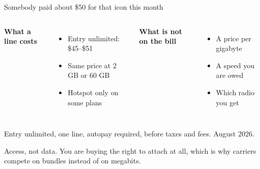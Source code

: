 \begin{frame}{Somebody paid about \$50 for that icon this month}
  \begin{columns}[T,onlytextwidth]
      \large\textbf{What a line costs}

      \vspace{0.5em}
      \small
      \begin{itemize}\itemsep4pt
        \item Entry unlimited: \$45--\$51
        \item Same price at 2 GB or 60 GB
        \item Hotspot only on some plans
      \end{itemize}
      \large\textbf{What is not on the bill}

      \vspace{0.5em}
      \small
      \begin{itemize}\itemsep4pt
        \item A price per gigabyte
        \item A speed you are owed
        \item Which radio you get
      \end{itemize}
  \end{columns}

  \vspace{0.2em}
  {\scriptsize\textcolor{softgray}{Entry unlimited, one line, autopay required, before taxes and fees. August 2026.}\par}

     {Access, not data. You are buying the right to attach at all, which is why
      carriers compete on bundles instead of on megabits.}
\end{frame}

